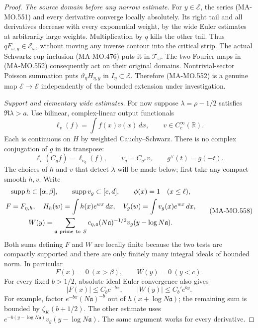 \begin{proof}
\emph{The source domain before any narrow estimate.}
For \(y\in\mathcal E\), the series (MA-MO.551) and
every derivative converge locally absolutely. Its right
tail and all derivatives decrease with every exponential
weight, by the wide Euler estimates at arbitrarily large
weights. Multiplication by \(q\) kills the other tail.
Thus \(qF_{\omega,y}\in\mathcal E_\omega\), without
moving any inverse contour into the critical strip.
The actual Schwartz-cup inclusion (MA-MO.476) puts it
in \(\mathcal T_\omega\). The two Fourier maps in
(MA-MO.552) consequently act on their original domains.
Nontrivial-sector Poisson summation puts
\(\vartheta_\eta H_{\eta,y}\) in \(I_\eta\subset\mathcal E\).
Therefore (MA-MO.552) is a genuine map
\(\mathcal E\to\mathcal E\) independently of the bounded
extension under investigation.

\emph{Support and elementary wide estimates.}
For now suppose
\(\lambda=\rho-1/2\) satisfies \(\Re\lambda>a\).
Use bilinear, complex-linear output functionals
\[
                  \ell_v(f)=\int f(x)v(x)\,dx,
                         \qquad v\in C_c^\infty(\mathbb R).
 \tag{MA-MO.556}
\]
Each is continuous on \(H\) by weighted Cauchy--Schwarz.
There is no complex conjugation of \(g\) in its transpose:
\[
 \ell_v(C_gf)=\ell_{v_g}(f),\qquad
 v_g=C_{g^\vee}v,\qquad g^\vee(t)=g(-t).
 \tag{MA-MO.557}
\]
The choices of \(h\) and \(v\) that detect \(\lambda\)
will be made below; first take any compact smooth \(h,v\).
Write
\[
 \begin{gathered}
 \operatorname{supp}h\subset[\alpha,\beta],\qquad
 \operatorname{supp}v_g\subset[c,d],\qquad
 \phi(x)=1\quad(x\le\ell),\\
 F=F_{\eta,h},\quad
 H_h(w)=\int h(x)e^{wx}\,dx,\quad
 V_g(w)=\int v_g(x)e^{wx}\,dx,\\
 W(y)=\sum_{\mathfrak a\ {\rm prime\ to}\ S}
       c_{\eta,\mathfrak a}(N\mathfrak a)^{-1/2}
                            v_g(y-\log N\mathfrak a).
 \end{gathered}
 \tag{MA-MO.558}
\]
Both sums defining \(F\) and \(W\) are locally finite
because the two tests are compactly supported and there
are only finitely many integral ideals of bounded norm.
In particular
\[
           F(x)=0\ (x>\beta),\qquad
           W(y)=0\ (y<c).
 \tag{MA-MO.559}
\]
For every fixed \(b>1/2\), absolute ideal Euler convergence
also gives
\[
             |F(x)|\le C_b e^{-bx},\qquad
             |W(y)|\le C_b' e^{by}.
 \tag{MA-MO.560}
\]
For example, factor \(e^{-bx}(N\mathfrak a)^{-b}\)
out of \(h(x+\log N\mathfrak a)\); the remaining sum
is bounded by \(\zeta_K(b+1/2)\). The other estimate
uses \(e^{-b(y-\log N\mathfrak a)}v_g(y-\log N\mathfrak a)\).
The same argument works for every derivative.


\end{proof}
